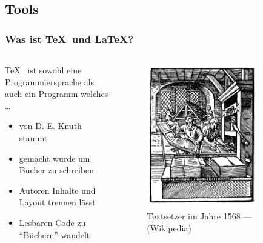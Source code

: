 \subsection{Tools}
\begin{frame}
	\frametitle{Was ist \TeX~und \LaTeX?}
	\begin{columns}
		\begin{column}{5cm}
			\TeX~ ist sowohl eine Programmiersprache als auch 
			ein Programm welches \dots
			\begin{itemize}
				\item von D. E. Knuth stammt
				\item gemacht wurde um Bücher zu schreiben
				\item Autoren Inhalte und Layout trennen 
					lässt
				\item Lesbaren Code zu "`Büchern"' wandelt
			\end{itemize}
		\end{column}
		\begin{column}{5cm}
			\begin{figure}
				\centering
				\includegraphics[width=0.8\textwidth]{fig/printer.png}
				\caption{Textsetzer im Jahre 1568 --- (Wikipedia) }
			\end{figure}
		\end{column}
	\end{columns}
\end{frame}

